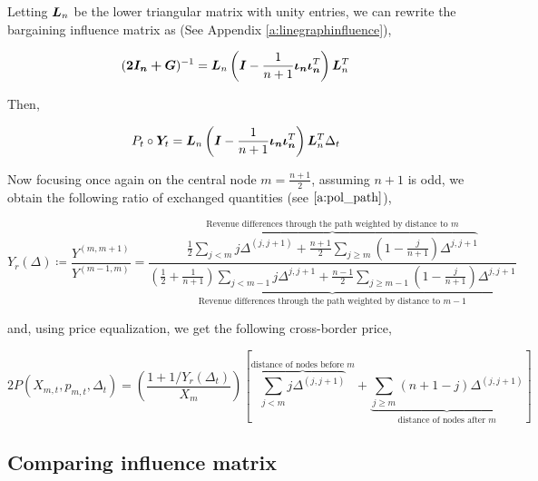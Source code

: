Letting $\bm{L}_n$ be the lower triangular matrix with unity entries, we can rewrite the bargaining influence matrix as (See Appendix \ref{a:linegraphinfluence}),

\begin{equation}
  (\bm{2I_n + \bm{G}})^{-1} = \bm{L}_n  \left(\bm{I} - \frac{1}{n+1} \bm{\iota_n \iota_n}^T\right) \bm{L}_n^T
\end{equation}

Then,

\begin{equation*}
  \begin{split}
    P_t \circ \bm{Y}_t &= \bm{L}_n  \left(\bm{I} - \frac{1}{n+1} \bm{\iota_n \iota_n}^T\right) \bm{L}_n^T  \Delta_t \\
  \end{split}
\end{equation*}

Now focusing once again on the central node $m = \frac{n+1}{2}$, assuming $n+1$ is odd, we obtain the following ratio of exchanged quantities (see $\ref{a:pol_path}$),

\begin{equation}
  Y_r(\Delta) \coloneqq \frac{Y^{(m, m+1)}}{Y^{(m-1, m)}}
  = \frac{
    \overbrace{\frac{1}{2} \sum_{j < m} j \Delta^{(j, j+1)} + \frac{n+1}{2}\sum_{j \geq m} \left(1 - \frac{j}{n+1}\right) \Delta^{j, j+1}}^{\text{Revenue differences through the path weighted by distance to } m}
  }{
    \underbrace{\left(\frac{1}{2} + \frac{1}{n+1}\right) \sum_{j < m-1} j \Delta^{j, j+1}+ \frac{n-1}{2} \sum_{j \geq m-1} \left(1 - \frac{j}{n+1}\right) \Delta^{j, j+1}}_{\text{Revenue differences through the path weighted by distance to } m-1}
  }
\end{equation}

and, using price equalization, we get the following cross-border price,

\begin{equation*}
  2 P(X_{m, t}, p_{m, t}, \Delta_t) = \left( \frac{1 + 1 / Y_r(\Delta_t)}{X_m} \right) \left[ \overbrace{\sum_{j < m} j \Delta^{(j, j + 1)}}^{\text{distance of nodes before } m} +  \underbrace{\sum_{j \geq m}\left(n + 1 - j\right) \Delta^{(j, j + 1)}}_{\text{distance of nodes after } m} \right]
\end{equation*}


\subsection{Comparing influence matrix}

